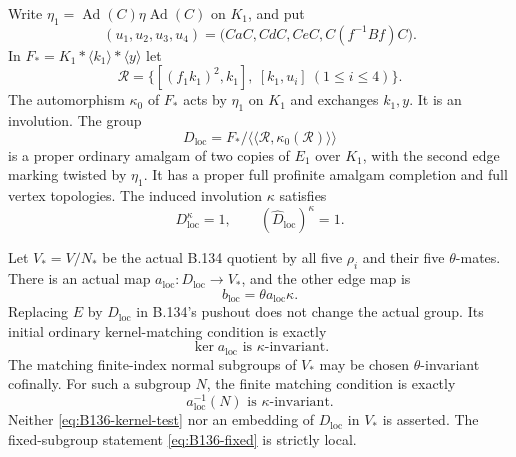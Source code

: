 Write $\eta_1=\operatorname{Ad}(C)\eta\operatorname{Ad}(C)$ on $K_1$,
and put
\[
 (u_1,u_2,u_3,u_4)
    =\bigl(CaC,CdC,CeC,C(f^{-1}Bf)C\bigr).
\]
In $F_*=K_1*\langle k_1\rangle*\langle y\rangle$ let
\begin{equation}\label{eq:B136-local-relators}
 \mathcal R=
 \bigl\{[(f_1k_1)^2,k_1],\ [k_1,u_i]\ (1\leq i\leq4)\bigr\}.
\end{equation}
The automorphism $\kappa_0$ of $F_*$ acts by $\eta_1$ on $K_1$
and exchanges $k_1,y$. It is an involution. The group
\begin{equation}\label{eq:B136-Dloc}
 D_{\mathrm{loc}}
 =F_*/\langle\!\langle\mathcal R,\kappa_0(\mathcal R)
                                      \rangle\!\rangle
\end{equation}
is a proper ordinary amalgam of two copies of $E_1$ over $K_1$,
with the second edge marking twisted by $\eta_1$. It has a proper
full profinite amalgam completion and full vertex topologies.
The induced involution $\kappa$ satisfies
\begin{equation}\label{eq:B136-fixed}
 D_{\mathrm{loc}}^{\kappa}=1,
 \qquad (\widehat D_{\mathrm{loc}})^{\kappa}=1.
\end{equation}

Let $V_*=V/N_*$ be the actual B.134 quotient by all five
$\rho_i$ and their five $\theta$-mates. There is an actual map
$a_{\mathrm{loc}}:D_{\mathrm{loc}}\to V_*$, and the other edge map is
\begin{equation}\label{eq:B136-two-maps}
 b_{\mathrm{loc}}=\theta a_{\mathrm{loc}}\kappa.
\end{equation}
Replacing $E$ by $D_{\mathrm{loc}}$ in B.134's pushout does not
change the actual group. Its initial ordinary kernel-matching
condition is exactly
\begin{equation}\label{eq:B136-kernel-test}
 \ker a_{\mathrm{loc}}\text{ is }\kappa\text{-invariant}.
\end{equation}
The matching finite-index normal subgroups of $V_*$ may be
chosen $\theta$-invariant cofinally. For such a subgroup $N$,
the finite matching condition is exactly
\begin{equation}\label{eq:B136-finite-test}
 a_{\mathrm{loc}}^{-1}(N)\text{ is }\kappa\text{-invariant}.
\end{equation}
Neither \eqref{eq:B136-kernel-test} nor an embedding of
$D_{\mathrm{loc}}$ in $V_*$ is asserted. The fixed-subgroup
statement \eqref{eq:B136-fixed} is strictly local.

